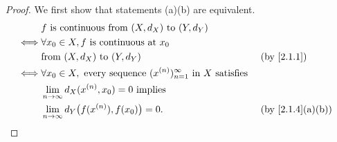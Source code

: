 \begin{proof}
  We first show that statements (a)(b) are equivalent.
  \begin{align*}
         & f \text{ is continuous from } (X, d_X) \text{ to } (Y, d_Y)                                                                              \\
    \iff & \forall x_0 \in X, f \text{ is continuous at } x_0                                                                                       \\
         & \text{from } (X, d_X) \text{ to } (Y, d_Y)                                                           &  & \by{2.1.1}                     \\
    \iff & \forall x_0 \in X, \text{ every sequence } (x^{(n)})_{n = 1}^\infty \text{ in } X \text{ satisfies }                                     \\
         & \lim_{n \to \infty} d_X(x^{(n)}, x_0) = 0 \text{ implies}                                                                                \\
         & \lim_{n \to \infty} d_Y\big(f(x^{(n)}), f(x_0)\big) = 0.                                             &  & \text{(by \cref{2.1.4}(a)(b))}
  \end{align*}


\end{proof}
